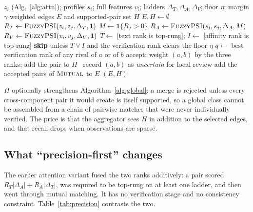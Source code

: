 \documentclass[conference]{IEEEtran}
\newcommand{\Ind}{\mathbf{1}}
\newcommand{\Mutual}{\textsc{Mutual}}
\newcommand{\FuzzyPSI}{\textsc{FuzzyPSI}}
\begin{document}
\begin{algorithm}[t]
\caption{Precision-first attention--affinity matching (deployed)}
\label{alg:precision}
\begin{algorithmic}[1]
\Require $z_i$ (Alg.~\ref{alg:attn}); profiles $s_i$; full features $v_i$; ladders $\Delta_T,\Delta_A,\Delta_V$; floor $\eta$; margin $\gamma$
\Ensure weighted edges $E$ and supported-pair set $H$
  \State $E,H\gets\emptyset$
    \State $R_T\gets\FuzzyPSI(z_i,z_j,\Delta_T,\Ind)$ 
    \State $M\gets\Ind\{R_T>0\}$
    \State $R_A\gets\FuzzyPSI(s_i,s_j,\Delta_A,M)$ 
    \State $R_V\gets\FuzzyPSI(v_i,v_j,\Delta_V,\Ind)$ 
      \State $T\gets$ [text rank is top-rung]; $I\gets$ [affinity rank is top-rung]
      \State \textbf{skip} unless $T\vee I$ and the verification rank clears the floor $\eta$
      \State $q\gets$ best verification rank of any rival of $a$ or of $b$
        \State accept: weight $(a,b)$ by the three ranks; add the pair to $H$
      \Else\ \State record $(a,b)$ as \emph{uncertain} for local review
      \EndIf
    \EndFor
    \State add the accepted pairs of $\Mutual$ to $E$
  \EndFor
  \State \Return $(E,H)$
\end{algorithmic}
\end{algorithm}

$H$ optionally strengthens Algorithm~\ref{alg:global}: a merge is
rejected unless every cross-component pair it would create is itself
supported, so a global class cannot be assembled from a chain of
pairwise matches that were never individually verified. The price is
that the aggregator sees $H$ in addition to the selected edges, and that
recall drops when observations are sparse.

\subsection{What ``precision-first'' changes}
\label{sec:diff}
The earlier attention variant fused the two ranks additively: a pair
scored $R_T|\Delta_A|+R_A|\Delta_T|$, was required to be top-rung on at
least one ladder, and then went through mutual matching. It has no
verification stage and no consistency constraint.
Table~\ref{tab:precision} contrasts the two.
\end{document}
